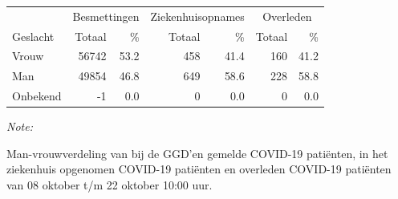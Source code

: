 \documentclass[
  english,
  man,floatsintext]{apa6}
\begin{document}
\begin{table}[H]
\centering\begingroup\fontsize{11}{13}\selectfont

\begin{threeparttable}
\begin{tabular}{lrrrrrr}
\toprule
\multicolumn{1}{c}{ } & \multicolumn{2}{c}{Besmettingen} & \multicolumn{2}{c}{Ziekenhuisopnames} & \multicolumn{2}{c}{Overleden} \\
\cmidrule(l{3pt}r{3pt}){2-3} \cmidrule(l{3pt}r{3pt}){4-5} \cmidrule(l{3pt}r{3pt}){6-7}
Geslacht & Totaal & \% & Totaal & \% & Totaal & \%\\
\midrule
Vrouw & 56742 & 53.2 & 458 & 41.4 & 160 & 41.2\\
Man & 49854 & 46.8 & 649 & 58.6 & 228 & 58.8\\
Onbekend & -1 & 0.0 & 0 & 0.0 & 0 & 0.0\\
\bottomrule
\end{tabular}
\begin{tablenotes}
\item \textit{Note: } 
\item Man-vrouwverdeling van bij de GGD’en gemelde COVID-19 patiënten, in het ziekenhuis opgenomen COVID-19 patiënten en overleden COVID-19 patiënten van 08 oktober t/m 22 oktober 10:00 uur.
\end{tablenotes}
\end{threeparttable}
\endgroup{}
\end{table}
\newpage
\end{document}
